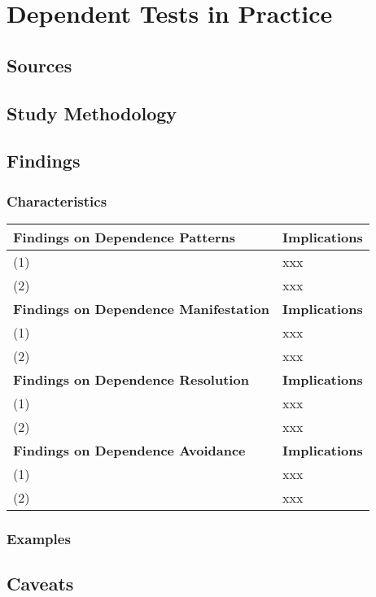 \section{Dependent Tests in Practice}

\subsection{Sources}

\subsection{Study Methodology}

\subsection{Findings}

\subsubsection{Characteristics}


\begin{table*}[t]
\vspace{1mm}
\centering
\small{
\begin{tabular}{|l|l|}
\hline
 \textbf{Findings on Dependence Patterns} & \textbf{Implications} \\
 \hline
 \hline
(1) & xxx \\
 \hline
(2) & xxx \\
\hline
 \textbf{Findings on Dependence Manifestation} & \textbf{Implications} \\
 \hline
 \hline
(1) & xxx \\
 \hline
(2) & xxx \\
\hline
 \textbf{Findings on Dependence Resolution} & \textbf{Implications} \\
 \hline
 \hline
(1) & xxx \\
 \hline
(2) & xxx \\
\hline
 \textbf{Findings on Dependence Avoidance} & \textbf{Implications} \\
 \hline
 \hline
(1) & xxx \\
 \hline
(2) & xxx \\
\hline
\end{tabular}
}
\vspace{-2mm}
\caption{{\label{tab:findings} }
}
\end{table*}

\subsubsection{Examples}

\subsection{Caveats}
